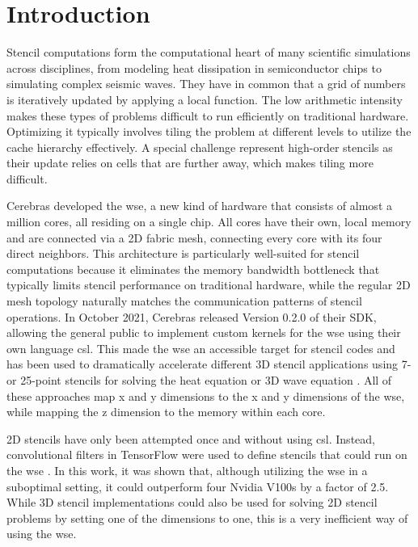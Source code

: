 \chapter{Introduction}
Stencil computations form the computational heart of many scientific simulations across disciplines, from modeling heat dissipation in semiconductor chips to simulating complex seismic waves.
They have in common that a grid of numbers is iteratively updated by applying a local function.
The low arithmetic intensity makes these types of problems difficult to run efficiently on traditional hardware.
Optimizing it typically involves tiling the problem at different levels to utilize the cache hierarchy effectively.
A special challenge represent high-order stencils as their update relies on cells that are further away, which makes tiling more difficult.

Cerebras developed the \acs{wse}, a new kind of hardware that consists of almost a million cores, all residing on a single chip.
All cores have their own, local memory and are connected via a 2D fabric mesh, connecting every core with its four direct neighbors.
This architecture is particularly well-suited for stencil computations because it eliminates the memory bandwidth bottleneck that typically limits stencil performance on traditional hardware, while the regular 2D mesh topology naturally matches the communication patterns of stencil operations.
In October 2021, Cerebras released Version 0.2.0 of their SDK, allowing the general public to implement custom kernels for the \ac{wse} using their own language \ac{csl}. 
This made the \ac{wse} an accessible target for stencil codes and has been used to dramatically accelerate different 3D stencil applications using 7- or 25-point stencils for solving the heat equation or 3D wave equation \cite{jacquelin2022scalable,rocki2020fast,woo2022disruptive,sai2024matrix}.
All of these approaches map x and y dimensions to the x and y dimensions of the \ac{wse}, while mapping the z dimension to the memory within each core.

2D stencils have only been attempted once and without using \ac{csl}. Instead, convolutional filters in TensorFlow were used to define stencils that could run on the \ac{wse} \cite{brown2022tensorflow}. In this work, it was shown that, although utilizing the \ac{wse} in a suboptimal setting, it could outperform four Nvidia V100s by a factor of 2.5. While 3D stencil implementations could also be used for solving 2D stencil problems by setting one of the dimensions to one, this is a very inefficient way of using the \ac{wse}.

